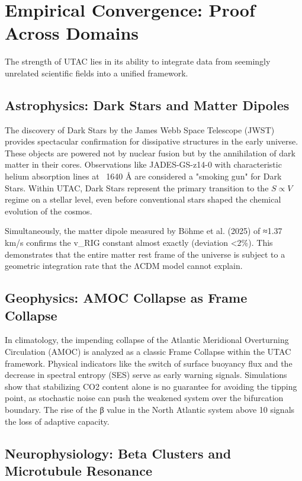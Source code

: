 \documentclass[11pt,a4paper]{article}
\begin{document}
\section{Empirical Convergence: Proof Across Domains}

The strength of UTAC lies in its ability to integrate data from seemingly unrelated scientific fields into a unified framework.

\subsection{Astrophysics: Dark Stars and Matter Dipoles}

The discovery of Dark Stars by the James Webb Space Telescope (JWST) provides spectacular confirmation for dissipative structures in the early universe. These objects are powered not by nuclear fusion but by the annihilation of dark matter in their cores. Observations like JADES-GS-z14-0 with characteristic helium absorption lines at ~1640 Å are considered a "smoking gun" for Dark Stars. Within UTAC, Dark Stars represent the primary transition to the $S \propto V$ regime on a stellar level, even before conventional stars shaped the chemical evolution of the cosmos.

Simultaneously, the matter dipole measured by Böhme et al. (2025) of ≈1.37 km/s confirms the v_RIG constant almost exactly (deviation <2\%). This demonstrates that the entire matter rest frame of the universe is subject to a geometric integration rate that the ΛCDM model cannot explain.

\subsection{Geophysics: AMOC Collapse as Frame Collapse}

In climatology, the impending collapse of the Atlantic Meridional Overturning Circulation (AMOC) is analyzed as a classic Frame Collapse within the UTAC framework. Physical indicators like the switch of surface buoyancy flux and the decrease in spectral entropy (SES) serve as early warning signals. Simulations show that stabilizing CO2 content alone is no guarantee for avoiding the tipping point, as stochastic noise can push the weakened system over the bifurcation boundary. The rise of the β value in the North Atlantic system above 10 signals the loss of adaptive capacity.

\subsection{Neurophysiology: Beta Clusters and Microtubule Resonance}
\end{document}
